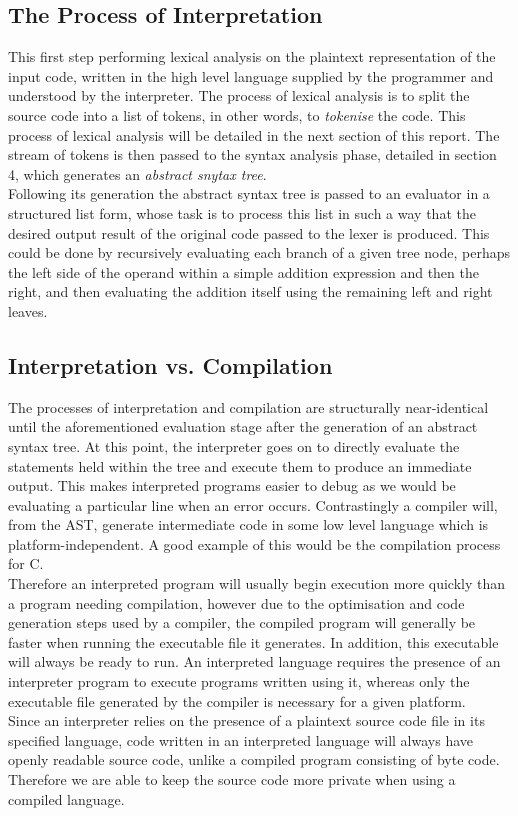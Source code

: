 \documentclass[a4paper, 11pt]{article}
\begin{document}
\subsection{The Process of Interpretation}
This first step performing lexical analysis on the plaintext representation of the input code, written in the high level language supplied by the programmer and understood by the interpreter. The process of lexical analysis is to split the source code into a list of tokens, in other words, to \textit{tokenise} the code. This process of lexical analysis will be detailed in the next section of this report. The stream of tokens is then passed to the syntax analysis phase, detailed in section 4, which generates an \textit{abstract snytax tree}.
\\\newline
Following its generation the abstract syntax tree is passed to an evaluator in a structured list form, whose task is to process this list in such a way that the desired output result of the original code passed to the lexer is produced. This could be done by recursively evaluating each branch of a given tree node, perhaps the left side of the operand within a simple addition expression and then the right, and then evaluating the addition itself using the remaining left and right leaves.

\subsection{Interpretation vs. Compilation}
The processes of interpretation and compilation are structurally near-identical until the aforementioned evaluation stage after the generation of an abstract syntax tree. At this point, the interpreter goes on to directly evaluate the statements held within the tree and execute them to produce an immediate output. This makes interpreted programs easier to debug as we would be evaluating a particular line when an error occurs. Contrastingly a compiler will, from the AST, generate intermediate code in some low level language which is platform-independent. A good example of this would be the compilation process for C.
\\\newline
Therefore an interpreted program will usually begin execution more quickly than a program needing compilation, however due to the optimisation and code generation steps used by a compiler, the compiled program will generally be faster when running the executable file it generates. In addition, this executable will always be ready to run. An interpreted language requires the presence of an interpreter program to execute programs written using it, whereas only the executable file generated by the compiler is necessary for a given platform.
\\\newline
Since an interpreter relies on the presence of a plaintext source code file in its specified language, code written in an interpreted language will always have openly readable source code, unlike a compiled program consisting of byte code. Therefore we are able to keep the source code more private when using a compiled language.
\end{document}
